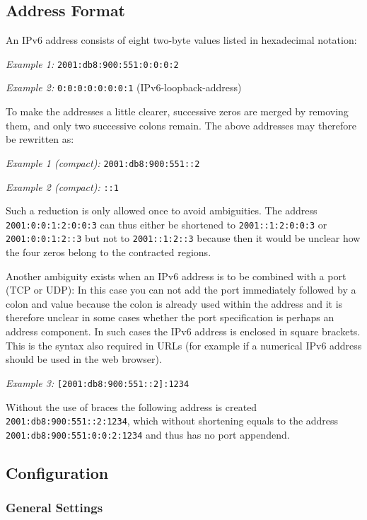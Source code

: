 \subsection{Address Format}

An IPv6 address consists of eight two-byte values listed 
in hexadecimal notation:

\emph{Example 1:} \verb*?2001:db8:900:551:0:0:0:2?

\emph{Example 2:} \verb*?0:0:0:0:0:0:0:1? (IPv6-loopback-address)

To make the addresses a little clearer, successive zeros are merged by removing 
them, and only two successive colons remain. The above addresses may therefore
be rewritten as:

\emph{Example 1 (compact):} \verb*?2001:db8:900:551::2?

\emph{Example 2 (compact):} \verb*?::1?

Such a reduction is only allowed once to avoid ambiguities. The address 
\verb*?2001:0:0:1:2:0:0:3? can thus either be shortened to \verb*?2001::1:2:0:0:3? 
or \verb*?2001:0:0:1:2::3? but not to \verb*?2001::1:2::3? because then it would 
be unclear how the four zeros belong to the contracted regions.

Another ambiguity exists when an IPv6 address is to be combined with a port
(TCP or UDP): In this case you can not add the port immediately followed by 
a colon and value because the colon is already used within the address and 
it is therefore unclear in some cases whether the port specification is 
perhaps an address component. In such cases the IPv6 address is enclosed 
in square brackets. This is the syntax also required in URLs (for example if
a numerical IPv6 address should be used in the web browser).

\emph{Example 3:} \verb*?[2001:db8:900:551::2]:1234? 

Without the use of braces the following address is created
\verb*?2001:db8:900:551::2:1234?, which without shortening equals to the address
\verb*?2001:db8:900:551:0:0:2:1234? and thus has no port appendend.

\subsection{Configuration}

\subsubsection{General Settings}

